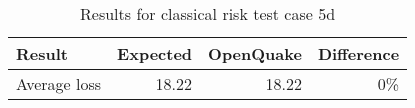 \begin{table}[htbp]

\centering
\begin{tabular}{ l r r r }

\hline
\rowcolor{anti-flashwhite}
\bf{Result} & \bf{Expected} & \bf{OpenQuake} & \bf{Difference}\\
\hline
Average loss & 18.22 & 18.22 & 0\% \\
\hline
\end{tabular}

\caption{Results for classical risk test case 5d}
\label{tab:result-classical-risk-5d}
\end{table}
